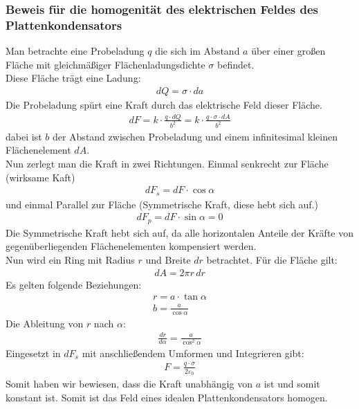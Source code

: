 \documentclass{scrartcl}
\begin{document}
\subsubsection{Beweis für die homogenität des elektrischen Feldes des Plattenkondensators}
Man betrachte eine Probeladung $q$ die sich im Abstand $a$ über einer großen Fläche mit 
gleichmäßiger Flächenladungsdichte $\sigma$ befindet.\\
Diese Fläche trägt eine Ladung:
\begin{align}
    dQ=\sigma\cdot da
\end{align}
Die Probeladung spürt eine Kraft durch das elektrische Feld dieser Fläche.
\begin{align}
    dF=k\cdot\frac{q\cdot dQ}{b^2}=k\cdot \frac{q\cdot \sigma\cdot dA}{b^2}
\end{align}
dabei ist $b$ der Abstand zwischen Probeladung und einem infinitesimal kleinen Flächenelement $dA$.\\

\noindent Nun zerlegt man die Kraft in zwei Richtungen. 
Einmal senkrecht zur Fläche (wirksame Kaft)
\begin{align}
    dF_s=dF\cdot \cos \alpha
\end{align}
und einmal Parallel zur Fläche (Symmetrische Kraft, diese hebt sich auf.)
\begin{align}
    dF_p=dF\cdot \sin \alpha=0
\end{align}
Die Symmetrische Kraft hebt sich auf, da alle horizontalen Anteile der Kräfte von gegenüberliegenden
Flächenelementen kompensiert werden.\\

\noindent Nun wird ein Ring mit Radius $r$ und Breite $dr$ betrachtet. Für die Fläche gilt:
\begin{align}
    dA=2\pi r\,dr
\end{align}
Es gelten folgende Beziehungen:
\begin{align}
    r=a\cdot\tan\alpha\\
    b=\frac{a}{\cos\alpha}
\end{align}
Die Ableitung von $r$ nach $\alpha$:
\begin{align}
    \frac{dr}{d\alpha}=\frac{a}{\cos^2\alpha}
\end{align}
Eingesetzt in $dF_s$ mit anschließendem Umformen und Integrieren gibt:
\begin{align}
    F=\frac{q\cdot \sigma}{2\varepsilon_0}
\end{align}
Somit haben wir bewiesen, dass die Kraft unabhängig von $a$ ist und somit konstant ist.
Somit ist das Feld eines idealen Plattenkondensators homogen.\\
\end{document}
